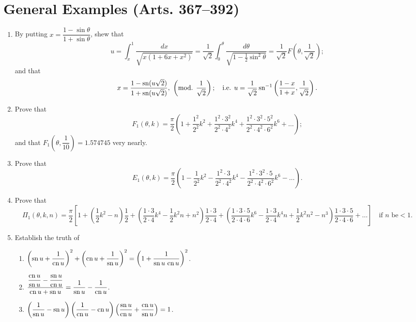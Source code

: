 \documentclass[11pt, a4paper]{article}
\begin{document}
\section*{General Examples (Arts. 367--392)}

\begin{enumerate}[leftmargin=2em]

\item By putting $x=\dfrac{1-\sin\theta}{1+\sin\theta}$, shew that
\[
u=\int_x^1\frac{dx}{\sqrt{x(1+6x+x^2)}}=\frac{1}{\sqrt2}\int_0^\theta\frac{d\theta}{\sqrt{1-\frac12\sin^2\theta}}=\frac{1}{\sqrt2}F\left(\theta,\frac{1}{\sqrt2}\right);
\]
and that
\[
x=\frac{1-\sn(u\sqrt2)}{1+\sn(u\sqrt2)},\ \left(\text{mod. }\frac{1}{\sqrt2}\right);\quad\text{i.e. } u=\frac{1}{\sqrt2}\sn^{-1}\left(\frac{1-x}{1+x},\frac{1}{\sqrt2}\right).
\]

\item Prove that
\[
F_1(\theta,k)=\frac{\pi}{2}\left(1+\frac{1^2}{2^2}k^2+\frac{1^2\cdot3^2}{2^2\cdot4^2}k^4+\frac{1^2\cdot3^2\cdot5^2}{2^2\cdot4^2\cdot6^2}k^6+\dots\right);
\]
and that $F_1\left(\theta,\dfrac1{10}\right)=1.574745$ very nearly.

\item Prove that
\[
E_1(\theta,k)=\frac{\pi}{2}\left(1-\frac{1}{2^2}k^2-\frac{1^2\cdot3}{2^2\cdot4^2}k^4-\frac{1^2\cdot3^2\cdot5}{2^2\cdot4^2\cdot6^2}k^6-\dots\right).
\]

\item Prove that
\[
\Pi_1(\theta,k,n)=\frac{\pi}{2}\left[1+\left(\frac12k^2-n\right)\frac12+\left(\frac{1\cdot3}{2\cdot4}k^4-\frac12k^2n+n^2\right)\frac{1\cdot3}{2\cdot4}+\left(\frac{1\cdot3\cdot5}{2\cdot4\cdot6}k^6-\frac{1\cdot3}{2\cdot4}k^4n+\frac12k^2n^2-n^3\right)\frac{1\cdot3\cdot5}{2\cdot4\cdot6}+\dots\right]\quad\text{if } n \text{ be}<1.
\]

\item Establish the truth of
\begin{enumerate}[label=(\alph*)]
\item $\left(\operatorname{sn} u+\dfrac1{\operatorname{cn} u}\right)^2+\left(\operatorname{cn} u+\dfrac1{\operatorname{sn} u}\right)^2=\left(1+\dfrac1{\operatorname{sn} u\,\operatorname{cn} u}\right)^2$.

\item $\dfrac{\dfrac{\operatorname{cn} u}{\operatorname{sn} u}-\dfrac{\operatorname{sn} u}{\operatorname{cn} u}}{\operatorname{cn} u+\operatorname{sn} u}=\dfrac1{\operatorname{sn} u}-\dfrac1{\operatorname{cn} u}$.

\item $\left(\dfrac1{\operatorname{sn} u}-\operatorname{sn} u\right)\left(\dfrac1{\operatorname{cn} u}-\operatorname{cn} u\right)\left(\dfrac{\operatorname{sn} u}{\operatorname{cn} u}+\dfrac{\operatorname{cn} u}{\operatorname{sn} u}\right)=1$.


\end{enumerate}
\end{enumerate}
\end{document}
